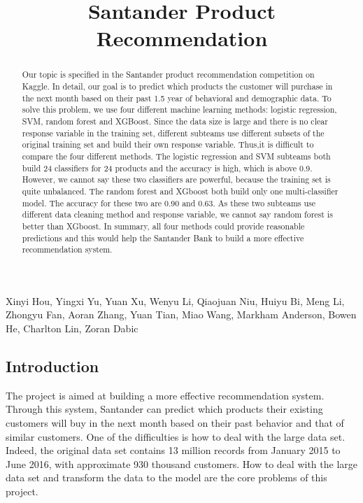 \documentclass{article}
\title{Santander Product Recommendation}
\begin{document}
	\maketitle
	\begin{center}\begin{Large} Xinyi Hou,
			Yingxi Yu,
			Yuan Xu,
			Wenyu Li,
			Qiaojuan Niu,
			Huiyu Bi,
			Meng Li,
			Zhongyu Fan,
			Aoran Zhang,
			Yuan Tian,
			Miao Wang,
			Markham Anderson,
			Bowen He,
			Charlton Lin,
			Zoran Dabic \end{Large}\end{center}
	\begin{spacing}{1}
		\begin{large}
			
\begin{abstract}
	 Our topic is specified in the Santander product recommendation competition on Kaggle. In detail, our goal is to predict which products the customer will purchase in the next month based on their past 1.5 year of behavioral and demographic data. To solve this problem, we use four different machine learning methods: logistic regression, SVM, random forest and XGBoost. Since the data size is large and there is no clear response variable in the training set, different subteams use different subsets of the original training set and build their own response variable. Thus,it is difficult to compare the four different methods. The logistic regression and SVM subteams both build 24 classifiers for 24 products and the accuracy is high, which is above 0.9. However, we cannot say these two classifiers are powerful, because the training set is quite unbalanced. The random forest and XGboost both build only one multi-classifier model. The accuracy for these two are 0.90 and 0.63. As these two subteams use different data cleaning method and response variable, we cannot say random forest is better than XGboost. In summary, all four methods could provide reasonable predictions and this would help the Santander Bank to build a more effective recommendation system.
\end{abstract}

\section{Introduction}
The project is aimed at building a more effective recommendation system. Through this system, Santander can predict which products their existing customers will buy in the next month based on their past behavior and that of similar customers. One of the difficulties is how to deal with the large data set. Indeed, the original data set contains 13 million records from January 2015 to June 2016, with approximate 930 thousand customers. How to deal with the large data set and transform the data to the model are the core problems of this project.


\end{large}
\end{spacing}
\end{document}
